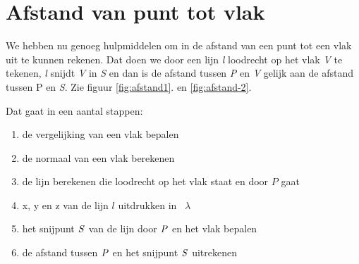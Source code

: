 \section{Afstand van punt tot vlak}
We hebben nu genoeg hulpmiddelen om in \RD de afstand van een punt tot een vlak uit te kunnen rekenen. Dat doen we   door een lijn \textit{l} loodrecht op het vlak \textit{V} te tekenen,\textit{ l }snijdt \textit{V} in\textit{ S} en dan is de afstand tussen \textit{P} en \textit{V} gelijk aan de afstand tussen P\textit{} en \textit{S}. Zie figuur   \ref{fig:afstand1}. en \ref{fig:afstand-2}.

Dat gaat in een aantal stappen:
\begin{enumerate}[label=(\alph*)]
	\item de vergelijking van een vlak bepalen
	\item de normaal van een vlak berekenen
	\item de lijn berekenen die  loodrecht op het vlak staat  en door $ P $ gaat
	\item x, y en z van de lijn $  l $  uitdrukken in \ $  \lambda $
	\item het snijpunt $\it{S}$  van de lijn door $\it{P}$  en het vlak bepalen
	\item  de afstand tussen $\it{P}$  en het snijpunt $\it{S}$  uitrekenen
\end{enumerate}	


